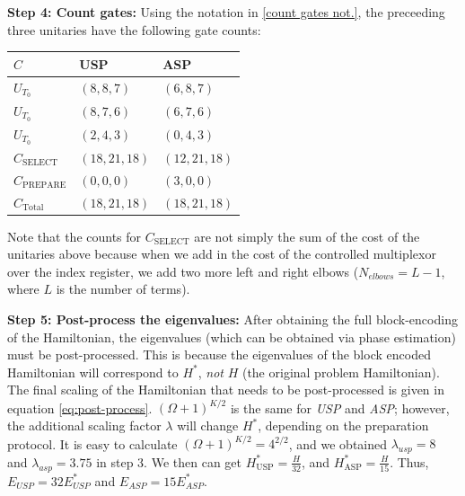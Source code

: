 \textbf{Step 4: Count gates:} Using the notation in \ref{count gates not.}, the preceeding three unitaries have the following gate counts:

\begin{center}
    \begin{tabular}{ |p{2cm}||p{3cm}|p{3cm}|}
        \hline
        $C$& USP &ASP\\
        \hline
        $U_{T_0}$   & $(8, 8, 7)$    &$(6, 8, 7)$\\
        $U_{T_0}$   & $(8, 7, 6)$    &$(6, 7, 6)$\\
        $U_{T_0}$   & $(2, 4, 3)$    &$(0, 4, 3)$\\
        \hline
        $C_{\text{SELECT}}$ & $(18, 21, 18)$ &$(12, 21, 18)$\\
        $C_{\text{PREPARE}}$ & $(0, 0, 0)$ &$(3, 0, 0)$\\
        \hline
        $C_{\text{Total}}$ & $(18, 21, 18)$& $(18, 21, 18)$\\
        \hline
       \end{tabular}
\end{center}

Note that the counts for $C_{\text{SELECT}}$ are not simply the sum of the cost of the unitaries above because when we add in the cost of the controlled multiplexor over the index register, we add two more left and right elbows ($N_{elbows} = L - 1$, where $L$ is the number of terms). 

\textbf{Step 5: Post-process the eigenvalues:} After obtaining the full block-encoding of the Hamiltonian, the eigenvalues (which can be obtained via phase estimation) must be post-processed. This is because the eigenvalues of the block encoded Hamiltonian will correspond to $H^*$, \textit{not} $H$ (the original problem Hamiltonian).
The final scaling of the Hamiltonian that needs to be post-processed is given in equation \ref{eq:post-process}. $(\Omega + 1)^{K / 2}$ is the same for \textit{USP} and \textit{ASP}; however, the additional scaling factor $\lambda$ will change $H^*$, depending on the preparation protocol. It is easy to calculate $(\Omega + 1)^{K/2} = 4^{2/2}$, and we obtained $\lambda_{usp} = 8$ and $\lambda_{asp} = 3.75$ in step 3. 
We then can get $H^*_{\text{USP}} = \frac{H}{32}$, and $H^*_{\text{ASP}} = \frac{H}{15}$. Thus, $E_{USP} = 32E^*_{USP}$ and $E_{ASP} = 15E^*_{ASP}$.